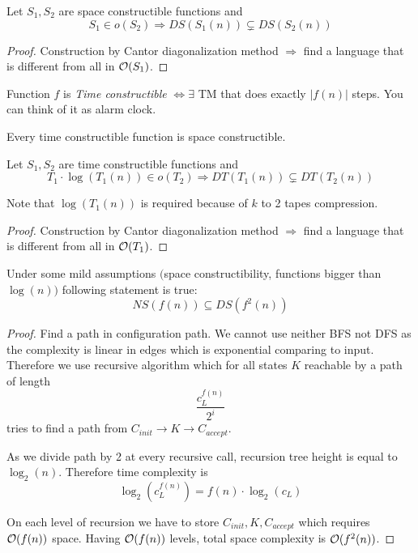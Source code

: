 \begin{theorem}\label{s_hier}
	Let $S_1, S_2$ are space constructible functions and
	\[ S_1 \in o(S_2) \Rightarrow DS(S_1(n)) \subsetneq DS(S_2(n)) \]
\end{theorem}
\begin{proof}
	Construction by Cantor diagonalization method $\Rightarrow$ find a language that is different from all in $\mathcal{O}(S_1)$.
\end{proof}

\begin{definition}
	Function $f$ is \emph{Time constructible} $\iff \exists$ TM that does exactly $|f(n)|$ steps. You can think of it as alarm clock.
\end{definition}

\begin{observation}
	Every time constructible function is space constructible.
\end{observation}

\begin{theorem}\label{t_hier}
	Let $S_1, S_2$ are time constructible functions and
	\[ T_1 \cdot \log(T_1(n)) \in o(T_2) \Rightarrow DT(T_1(n)) \subsetneq DT(T_2(n)) \]

	Note that $\log(T_1(n))$ is required because of $k$ to 2 tapes compression.
\end{theorem}
\begin{proof}
	Construction by Cantor diagonalization method $\Rightarrow$ find a language that is different from all in $\mathcal{O}(T_1)$.
\end{proof}

\begin{theorem}[Savic]\label{savic}
	Under some mild assumptions $($space constructibility, functions bigger than $\log(n))$ following statement is true:
	\[ NS(f(n)) \subseteq DS(f^2(n)) \]

\end{theorem}
\begin{proof}
	Find a path in configuration path. We cannot use neither BFS not DFS as the complexity is linear in edges which is exponential comparing to input.
	Therefore we use recursive algorithm which for all states $K$ reachable by a path of length
	\[ \frac{c_L^{f(n)}}{2^i}\]
	tries to find a path from $C_{init} \to K \to C_{accept}$.

	As we divide path by 2 at every recursive call, recursion tree height is equal to $\log_2(n)$.
	Therefore time complexity is
	\[ \log_2(c_L^{f(n)}) = f(n) \cdot \log_2(c_L) \]

	On each level of recursion we have to store $C_{init}, K, C_{accept}$ which requires $\mathcal{O}(f(n))$ space.
	Having $\mathcal{O}(f(n))$ levels, total space complexity is $\mathcal{O}(f^2(n))$.
\end{proof}

